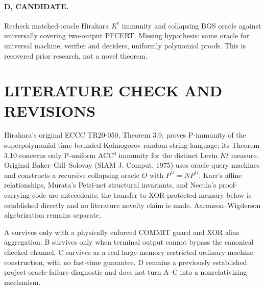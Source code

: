 \documentclass[11pt]{article}
\begin{document}
\paragraph{D, CANDIDATE.} Recheck matched-oracle Hirahara $K^t$ immunity and collapsing BGS oracle against universally covering two-output PFCERT. Missing hypothesis: same oracle for universal machine, verifier and deciders, uniformly polynomial proofs. This is recovered prior research, not a novel theorem.

\section{LITERATURE CHECK AND REVISIONS}
Hirahara's original ECCC TR20-050, Theorem 3.9, proves P-immunity of the superpolynomial time-bounded Kolmogorov random-string language; its Theorem 3.10 concerns only P-uniform ACC$^0$ immunity for the distinct Levin $Kt$ measure. Original Baker--Gill--Solovay (SIAM J. Comput. 1975) uses oracle query machines and constructs a recursive collapsing oracle $O$ with $P^O=NP^O$. Karr's affine relationships, Murata's Petri-net structural invariants, and Necula's proof-carrying code are antecedents; the transfer to XOR-protected memory below is established directly and no literature novelty claim is made. Aaronson--Wigderson algebrization remains separate.

A survives only with a physically enforced COMMIT guard and XOR alias aggregation. B survives only when terminal output cannot bypass the canonical checked channel. C survives as a real large-memory restricted ordinary-machine construction, with no fast-time guarantee. D remains a previously established project oracle-failure diagnostic and does not turn A--C into a nonrelativizing mechanism.
\end{document}
